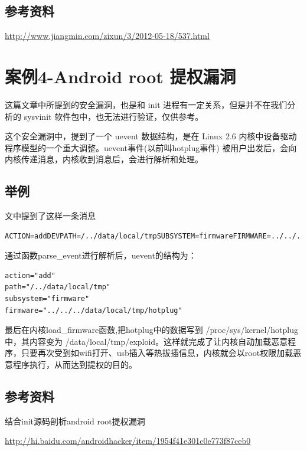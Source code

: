 \subsection{参考资料}

\url{http://www.jiangmin.com/zixun/3/2012-05-18/537.html}

\section{案例4-Android root 提权漏洞}

这篇文章中所提到的安全漏洞，也是和 init
进程有一定关系，但是并不在我们分析的 sysvinit
软件包中，也无法进行验证，仅供参考。

这个安全漏洞中，提到了一个 uevent 数据结构，是在 Linux 2.6
内核中设备驱动程序模型的一个重大调整。uevent事件(以前叫hotplug事件)
被用户出发后，会向内核传递消息，内核收到消息后，会进行解析和处理。

\subsection{举例}

文中提到了这样一条消息

{\begin{shaded}\begin{verbatim}
ACTION=addDEVPATH=/../data/local/tmpSUBSYSTEM=firmwareFIRMWARE=../../../data/local/tmp/hotplug
\end{verbatim}\end{shaded}}
通过函数parse\_event进行解析后，uevent的结构为：

{\begin{shaded}\begin{verbatim}
action="add"
path="/../data/local/tmp"
subsystem="firmware"
firmware="../../../data/local/tmp/hotplug"
\end{verbatim}\end{shaded}}
最后在内核load\_firmware函数,把hotplug中的数据写到
/proc/sys/kernel/hotplug 中，其内容变为
/data/local/tmp/exploid。这样就完成了让内核自动加载恶意程序，只要再次受到如wifi打开、usb插入等热拔插信息，内核就会以root权限加载恶意程序执行，从而达到提权的目的。

\subsection{参考资料}

结合init源码剖析android root提权漏洞

\url{http://hi.baidu.com/androidhacker/item/1954f41e301c0e773f87ceb0}

